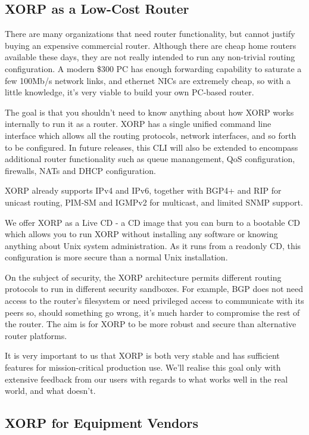 \subsection{XORP as a Low-Cost Router}

There are many organizations that need router functionality, but
cannot justify buying an expensive commercial router.  Although there
are cheap home routers available these days, they are not really
intended to run any non-trivial routing configuration.  A modern \$300
PC has enough forwarding capability to saturate a few 100Mb/s network
links, and ethernet NICs are extremely cheap, so with a little
knowledge, it's very viable to build your own PC-based router.

The goal is that you shouldn't need to know anything about how XORP
works internally to run it as a router.  XORP has a single unified
command line interface which allows all the routing protocols, network
interfaces, and so forth to be configured.  In future releases, this
CLI will also be extended to encompass additional router functionality
such as queue manangement, QoS configuration, firewalls, NATs and DHCP
configuration.

XORP already supports IPv4 and IPv6, together with BGP4+ and RIP for
unicast routing, PIM-SM and IGMPv2 for multicast, and limited SNMP
support.  

We offer XORP as a Live CD - a CD image that you can burn to a
bootable CD which allows you to run XORP without installing any
software or knowing anything about Unix system administration.  As it
runs from a readonly CD, this configuration is more secure than a
normal Unix installation.

On the subject of security, the XORP architecture permits different
routing protocols to run in different security sandboxes.  For
example, BGP does not need access to the router's filesystem or need
privileged access to communicate with its peers so, should something
go wrong, it's much harder to compromise the rest of the router.  The
aim is for XORP to be more robust and secure than alternative router
platforms.

It is very important to us that XORP is both very stable and has
sufficient features for mission-critical production use.  We'll
realise this goal only with extensive feedback from our users with
regards to what works well in the real world, and what doesn't.


\subsection{XORP for Equipment Vendors}

